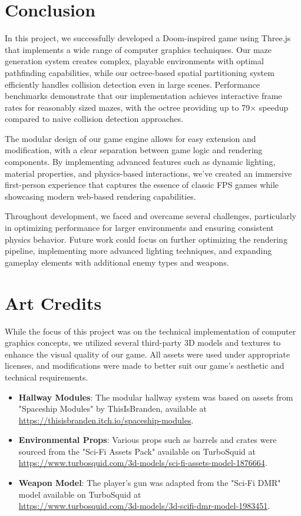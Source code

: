 \documentclass{article}
\begin{document}
\section{Conclusion}
In this project, we successfully developed a Doom-inspired game using Three.js
that implements a wide range of computer graphics techniques. Our maze
generation system creates complex, playable environments with optimal
pathfinding capabilities, while our octree-based spatial partitioning system
efficiently handles collision detection even in large scenes. Performance
benchmarks demonstrate that our implementation achieves interactive frame rates
for reasonably sized mazes, with the octree providing up to 79× speedup
compared to naive collision detection approaches.

The modular design of our game engine allows for easy extension and
modification, with a clear separation between game logic and rendering
components. By implementing advanced features such as dynamic lighting,
material properties, and physics-based interactions, we've created an immersive
first-person experience that captures the essence of classic FPS games while
showcasing modern web-based rendering capabilities.

Throughout development, we faced and overcame several challenges, particularly
in optimizing performance for larger environments and ensuring consistent
physics behavior. Future work could focus on further optimizing the rendering
pipeline, implementing more advanced lighting techniques, and expanding
gameplay elements with additional enemy types and weapons.


\pagebreak
\section{Art Credits}
While the focus of this project was on the technical implementation of computer graphics concepts, we utilized several third-party 3D models and textures to enhance the visual quality of our game. All assets were used under appropriate licenses, and modifications were made to better suit our game's aesthetic and technical requirements.

\begin{itemize}
    \item \textbf{Hallway Modules}: The modular hallway system was based on assets from "Spaceship Modules" by ThisIsBranden, available at \url{https://thisisbranden.itch.io/spaceship-modules}.

    \item \textbf{Environmental Props}: Various props such as barrels and crates were sourced from the "Sci-Fi Assets Pack" available on TurboSquid at \url{https://www.turbosquid.com/3d-models/sci-fi-assets-model-1876664}.

    \item \textbf{Weapon Model}: The player's gun was adapted from the "Sci-Fi DMR" model available on TurboSquid at\\\url{https://www.turbosquid.com/3d-models/3d-scifi-dmr-model-1983451}.
\end{itemize}
\end{document}
